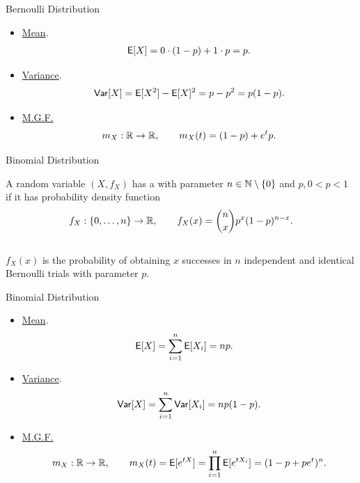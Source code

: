 \begin{frame}{Bernoulli Distribution}

\justifying
{}
\begin{itemize}
	\justifying
	\item \underline{Mean}.
	\begin{align*}
	\mathsf{E}[X] = 0\cdot (1-p) + 1\cdot p = p.
	\end{align*}
	\item \underline{Variance}.
	\begin{align*}
	\mathsf{Var}[X] = \mathsf{E}[X^2] - \mathsf{E}[X]^2 = p - p^2 = p(1-p).
	\end{align*}
	\item \underline{M.G.F.}
	\begin{align*}
	m_X: \mathbb{R}\rightarrow \mathbb{R}, \qquad m_X(t) = (1-p) + e^tp.
	\end{align*}
\end{itemize}

\end{frame}

\begin{frame}{Binomial Distribution}

\justifying
{} A random variable $(X, f_X)$ has a  with parameter $n\in \mathbb{N}\setminus\{0\}$ and $p, 0 < p < 1$ if it has probability density function
\begin{align*}
f_X: \{0, \ldots, n\} \rightarrow \mathbb{R}, \qquad f_X(x) = \binom{n}{x} p^x(1-p)^{n-x}.
\end{align*}
~\\
 $f_X(x)$ is the probability of obtaining $x$ successes in $n$ independent and identical Bernoulli trials with parameter $p$.


\end{frame}


\begin{frame}{Binomial Distribution}

\justifying
{} 
\begin{itemize}
	\justifying
	\item \underline{Mean}.
	\begin{align*}
	\mathsf{E}[X] & = \sum_{i=1}^n \mathsf{E}[X_i] = np.
	\end{align*}
	\item \underline{Variance}. 
	\begin{align*}
	\mathsf{Var}[X] = \sum_{i=1}^n\mathsf{Var}[X_i] = np(1-p).
	\end{align*}
	\item \underline{M.G.F.}
	\begin{align*}
	m_X: \mathbb{R}\rightarrow\mathbb{R}, \qquad m_X(t) = \mathsf{E}[e^{tX}] = \prod_{i=1}^n\mathsf{E}[e^{tX_i}] = (1 - p + pe^t)^n.
	\end{align*}
\end{itemize}

\end{frame}

